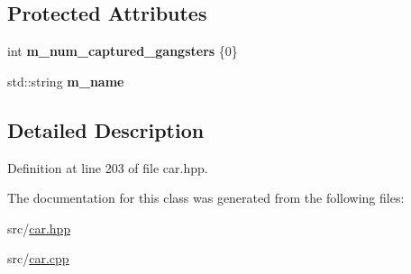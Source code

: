 \subsection*{Protected Attributes}
\begin{DoxyCompactItemize}
\item 
\hypertarget{classjustine_1_1robocar_1_1CopCar_ab39986181979d32ed8c7b9fc4b65e377}{int {\bfseries m\-\_\-num\-\_\-captured\-\_\-gangsters} \{0\}}\label{classjustine_1_1robocar_1_1CopCar_ab39986181979d32ed8c7b9fc4b65e377}

\item 
\hypertarget{classjustine_1_1robocar_1_1CopCar_a6dbe62788efb68e49cd3bf842bd8f0c7}{std\-::string {\bfseries m\-\_\-name}}\label{classjustine_1_1robocar_1_1CopCar_a6dbe62788efb68e49cd3bf842bd8f0c7}

\end{DoxyCompactItemize}


\subsection{Detailed Description}


Definition at line 203 of file car.\-hpp.



The documentation for this class was generated from the following files\-:\begin{DoxyCompactItemize}
\item 
src/\hyperlink{car_8hpp}{car.\-hpp}\item 
src/\hyperlink{car_8cpp}{car.\-cpp}\end{DoxyCompactItemize}
